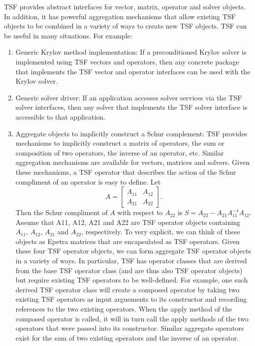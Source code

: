 \documentclass[12pt,relax]{SANDreport}
\begin{document}
TSF provides abstract interfaces for vector, matrix, operator and solver objects.  In
addition, it has powerful aggregation mechanisms that allow existing TSF objects to 
be combined in a variety of ways to create new TSF objects.
TSF can be useful in many situations.  For example:
\begin{enumerate}
\item Generic Krylov method implementation:  If a preconditioned Krylov solver 
is implemented using TSF vectors and operators, then any concrete package that implements
the TSF vector and operator interfaces can be used with the Krylov solver.
\item Generic solver driver:  If an application accesses solver services via the TSF
solver interfaces, then any solver that implements the TSF solver interface is 
accessible to that application.
\item Aggregate objects to implicitly construct a Schur complement: 
TSF provides mechanisms to implicitly 
construct a matrix of operators, the sum or composition of two operators, the inverse
of an operator, etc.  Similar aggregation mechanisms are available for vectors, matrices
and solvers.  Given these mechanisms, a TSF operator that describes the action of the
Schur compliment of an operator is easy to define.  Let
\[
A=\left[
\begin{array}{ll}
A_{11} & A_{12} \\
A_{21} & A_{22}
\end{array} \right].
\]
Then the Schur compliment of $A$ with respect to $A_{22}$ is 
$S = A_{22} - A_{21}A_{11}^{-1}A_{12}$.
Assume that A11, A12, A21 and A22 are TSF operator objects containing $A_{11}$, $A_{12}$,
$A_{21}$ and $A_{22}$, respectively.  To very explicit, we can think of these objects
 as Epetra matrices that are encapsulated as TSF operators.  Given these four TSF operator 
objects, we can form aggregate TSF operator objects in a variety of ways.  In particular,
TSF has operator classes that are derived from the base TSF operator class (and are thus
also TSF operator objects) but require existing TSF operators to be well-defined.  For
example, one such derived TSF operator class will create a composed operator by
taking two existing TSF operators as
input arguements to its constructor and recording references to the two existing operators.
When the apply method of the composed operator is called, it will in turn call the apply
methods of the two operators that were passed into its constructor.  Similar aggregate
operators exist for the sum of two existing operators and the inverse of an operator.


\end{enumerate}
\end{document}
